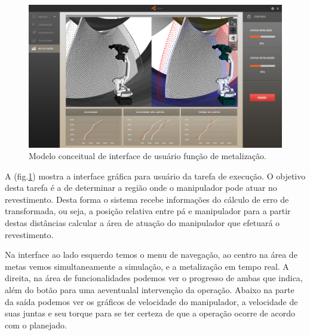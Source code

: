 \documentclass[12pt,a4paper]{article}
\begin{document}
\begin{figure}[H]
\begin{center}
  \includegraphics[width=\columnwidth]{figs/Execucao.jpg}
  \caption{Modelo conceitual de interface de usuário função de metalização.}
  \label{fig:Interface_execucao}
\end{center}
\end{figure} 

A (fig.\ref{fig:Interface_execucao}) mostra a interface gráfica para usuário
da tarefa de execução. O objetivo desta tarefa é a de determinar a região
onde o manipulador pode atuar no revestimento. Desta forma o sistema recebe
informações do cálculo de erro de transformada, ou seja, a posição relativa
entre pá e manipulador para a partir destas distâncias calcular a área de
atuação do manipulador que efetuará o revestimento.

Na interface ao lado esquerdo temos o menu de navegação, ao centro na área de
metas vemos simultaneamente a simulação, e a metalização em tempo real. A
direita, na área de funcionalidades podemos ver o progresso de ambas que
indica, além do botão para uma aeventualal intervençào da operação.
Abaixo na parte da saída podemos ver os gráficos de velocidade do manipulador, a
velocidade de suas juntas e seu torque para se ter certeza de que a operação
ocorre de acordo com o planejado.



 
\end{document}
